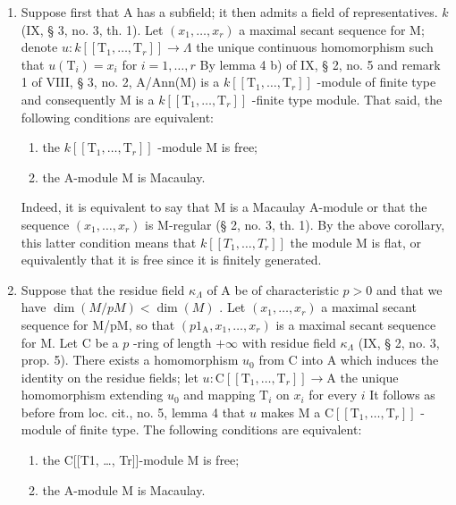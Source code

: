\begin{enumerate}
\def\labelenumi{\arabic{enumi})}
\tightlist
\item
  Suppose first that A has a subfield; it then admits a field of representatives. \(k\) (IX, § 3, no. 3, th. 1). Let \((x_{1},\ldots ,x_{r})\) a maximal secant sequence for M; denote \(u:k[[\mathrm{T}_{1},\dots ,\mathrm{T}_{r}]]\longrightarrow \Lambda\) the unique continuous homomorphism such that \(u(\mathrm{T}_i) = x_i\) for \(i = 1,\dots ,r\) By lemma 4 b) of IX, § 2, no. 5 and remark 1 of VIII, § 3, no. 2, A/Ann(M) is a \(k[[\mathrm{T}_{1},\dots ,\mathrm{T}_{r}]]\) -module of finite type and consequently M is a \(k[[\mathrm{T}_{1},\dots ,\mathrm{T}_{r}]]\) -finite type module. That said, the following conditions are equivalent:
  \begin{enumerate}
  \def\labelenumii{(\roman{enumii})}
  \item
  the \(k[[\mathrm{T}_1,\dots ,\mathrm{T}_r]]\) -module M is free;
\item
  the A-module M is Macaulay.
\end{enumerate}

Indeed, it is equivalent to say that M is a Macaulay A-module or that the sequence \((x_{1},\ldots,x_{r})\) is M-regular (§ 2, no. 3, th. 1). By the above corollary, this latter condition means that \(k[[T_{1},\ldots,T_{r}]]\) the module M is flat, or equivalently that it is free since it is finitely generated.

\item
  Suppose that the residue field \(\kappa_{\Lambda}\) of A be of characteristic \(p > 0\) and that we have \(\dim(M/pM) < \dim(M)\) . Let \((x_1, \ldots, x_r)\) a maximal secant sequence for M/pM, so that \((p1_{\mathrm{A}}, x_1, \ldots, x_r)\) is a maximal secant sequence for M. Let C be a \(p\) -ring of length \(+\infty\) with residue field \(\kappa_{\Lambda}\) (IX, § 2, no. 3, prop. 5). There exists a homomorphism \(u_0\) from C into A which induces the identity on the residue fields; let \(u: \mathrm{C}[[\mathrm{T}_1, \ldots, \mathrm{T}_r]] \longrightarrow \mathrm{A}\) the unique homomorphism extending \(u_0\) and mapping \(\mathrm{T}_i\) on \(x_i\) for every \(i\) It follows as before from loc. cit., no. 5, lemma 4 that \(u\) makes M a \(\mathrm{C}[[\mathrm{T}_1, \ldots, \mathrm{T}_r]]\) -module of finite type. The following conditions are equivalent:
  \begin{enumerate}
  \def\labelenumii{(\roman{enumii})}
\item
  the C{[}{[}T1, \ldots, Tr{]}{]}-module M is free;
\item
  the A-module M is Macaulay.
\end{enumerate}


\end{enumerate}
